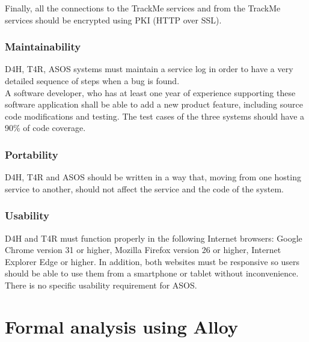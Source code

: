 \documentclass[hidelinks, 12pt]{report}
\begin{document}
Finally, all the connections to the TrackMe services and from the TrackMe services should be encrypted using PKI (HTTP over SSL).

\subsection{Maintainability}
D4H, T4R, ASOS systems must maintain a service log in order to have a very detailed sequence of steps when a bug is found.\\

A software developer, who has at least one year of experience supporting these software application shall be able to add a new product feature, including source code modifications and testing. The test cases of the three systems should have a 90\% of code coverage.\\

\subsection{Portability}
D4H, T4R and ASOS should be written in a way that, moving from one hosting service to another, should not affect the service and the code of the system.

\subsection{Usability}
D4H and T4R must function properly in the following Internet browsers: Google Chrome version 31 or higher, Mozilla Firefox version 26 or higher, Internet Explorer Edge or higher. In addition, both websites must be responsive so users should be able to use them from a smartphone or tablet without inconvenience.\\

There is no specific usability requirement for ASOS.

\chapter{Formal analysis using Alloy}
\end{document}
